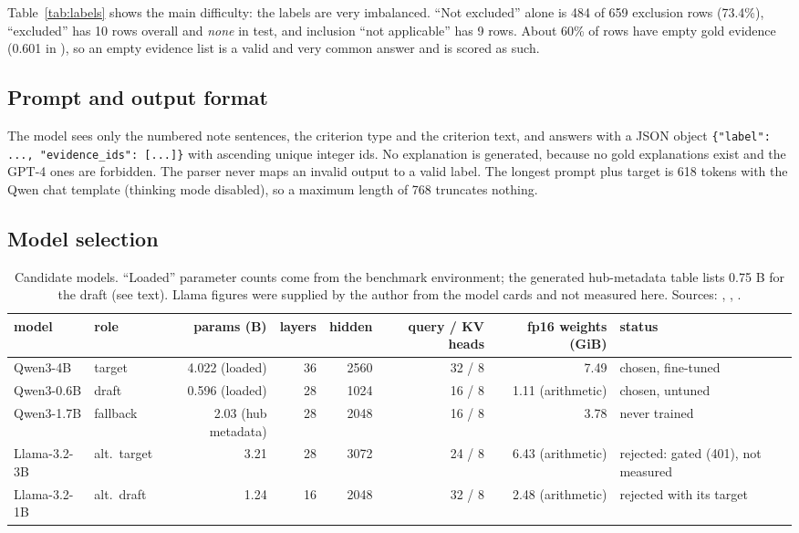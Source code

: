\documentclass[conference]{IEEEtran}
\newcommand{\code}[1]{\texttt{#1}}
\begin{document}
Table~\ref{tab:labels} shows the main difficulty: the labels are very imbalanced. ``Not excluded'' alone is 484 of 659 exclusion rows (73.4\%), ``excluded'' has 10 rows overall and \emph{none} in test, and inclusion ``not applicable'' has 9 rows. About 60\% of rows have empty gold evidence (0.601 in ), so an empty evidence list is a valid and very common answer and is scored as such.

\subsection{Prompt and output format}
The model sees only the numbered note sentences, the criterion type and the criterion text, and answers with a JSON object \code{\{"label": ..., "evidence\_ids": [...]\}} with ascending unique integer ids. No explanation is generated, because no gold explanations exist and the GPT-4 ones are forbidden. The parser never maps an invalid output to a valid label. %
The longest prompt plus target is 618 tokens with the Qwen chat template (thinking mode disabled), so a maximum length of 768 truncates nothing. %

\subsection{Model selection}
\begin{table}[t]
\caption{Candidate models. ``Loaded'' parameter counts come from the benchmark environment; the generated hub-metadata table lists 0.75 B for the draft (see text). Llama figures were supplied by the author from the model cards and not measured here. Sources: \protect{}, \protect{}, \protect{}.}\label{tab:models}
\centering\scriptsize\setlength{\tabcolsep}{3pt}
\begin{tabular}{llrrrrrl}
\toprule
model & role & params (B) & layers & hidden & query / KV heads & fp16 weights (GiB) & status\\
\midrule
Qwen3-4B & target & 4.022 (loaded) & 36 & 2560 & 32 / 8 & 7.49 & chosen, fine-tuned\\
Qwen3-0.6B & draft & 0.596 (loaded) & 28 & 1024 & 16 / 8 & 1.11 (arithmetic) & chosen, untuned\\
Qwen3-1.7B & fallback & 2.03 (hub metadata) & 28 & 2048 & 16 / 8 & 3.78 & never trained\\
Llama-3.2-3B & alt.\ target & 3.21 & 28 & 3072 & 24 / 8 & 6.43 (arithmetic) & rejected: gated (401), not measured\\
Llama-3.2-1B & alt.\ draft & 1.24 & 16 & 2048 & 32 / 8 & 2.48 (arithmetic) & rejected with its target\\
\bottomrule
\end{tabular}
\end{table}
\end{document}
